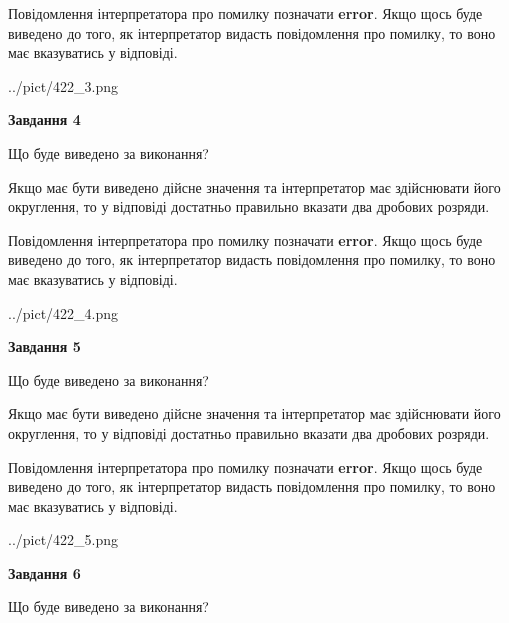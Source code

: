 \documentclass[12pt, ukrainian]{article}
\begin{document}
{\begin {Large}
Повідомлення інтерпретатора про помилку позначати \textbf{error}.
Якщо щось буде виведено до того, як інтерпретатор видасть повідомлення про помилку, 
то воно має вказуватись у відповіді. \par

\begin{center}
	{../pict/422_3.png}
\end{center}
\newpage

{\begin {center}\textbf{Завдання 4}\end {center}}\par
Що буде виведено за виконання? \par

Якщо має бути виведено дійсне значення та інтерпретатор має здійснювати його округлення, 
то у відповіді достатньо правильно вказати два дробових розряди.

Повідомлення інтерпретатора про помилку позначати \textbf{error}.
Якщо щось буде виведено до того, як інтерпретатор видасть повідомлення про помилку, 
то воно має вказуватись у відповіді. \par

\begin{center}
	{../pict/422_4.png}
\end{center}
\newpage

{\begin {center}\textbf{Завдання 5}\end {center}}\par
Що буде виведено за виконання? \par

Якщо має бути виведено дійсне значення та інтерпретатор має здійснювати його округлення, 
то у відповіді достатньо правильно вказати два дробових розряди.

Повідомлення інтерпретатора про помилку позначати \textbf{error}.
Якщо щось буде виведено до того, як інтерпретатор видасть повідомлення про помилку, 
то воно має вказуватись у відповіді. \par

\begin{center}
	{../pict/422_5.png}
\end{center}
\newpage

{\begin {center}\textbf{Завдання 6}\end {center}}\par
Що буде виведено за виконання? \par


\end{Large}}
\end{document}
